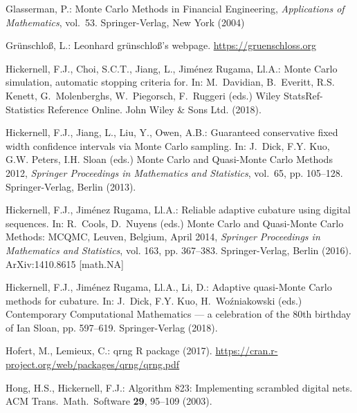 \documentclass[graybox]{svmult}
\begin{document}
\begin{thebibliography}{10}
	Glasserman, P.: {M}onte {C}arlo Methods in Financial Engineering,
	\emph{Applications of Mathematics}, vol.~53.
	\newblock Springer-Verlag, New York (2004)

	Gr\"unschlo{\ss}, L.: Leonhard gr\"unschlo{\ss}'s webpage.
	\newblock \urlprefix\url{https://gruenschloss.org}

	Hickernell, F.J., Choi, S.C.T., Jiang, L., {Jim\'enez Rugama}, {\relax
		Ll}.A.: {M}onte {C}arlo simulation, automatic stopping criteria for.
	\newblock In: M.~Davidian, B.~Everitt, R.S. Kenett, G.~Molenberghs,
	W.~Piegorsch, F.~Ruggeri (eds.) Wiley StatsRef-Statistics Reference Online.
	John Wiley \& Sons Ltd. (2018).
	\newblock {}

	Hickernell, F.J., Jiang, L., Liu, Y., Owen, A.B.: Guaranteed conservative
	fixed width confidence intervals via {M}onte {C}arlo sampling.
	\newblock In: J.~Dick, F.Y. Kuo, G.W. Peters, I.H. Sloan (eds.) {M}onte {C}arlo
	and Quasi-{M}onte {C}arlo Methods 2012, \emph{Springer Proceedings in
		Mathematics and Statistics}, vol.~65, pp. 105--128. Springer-Verlag, Berlin
	(2013).
	\newblock {}

	Hickernell, F.J., {Jim\'enez Rugama}, {\relax Ll}.A.: Reliable adaptive
	cubature using digital sequences.
	\newblock In: R.~Cools, D.~Nuyens (eds.) {M}onte {C}arlo and Quasi-{M}onte
	{C}arlo Methods: {MCQMC}, {L}euven, {B}elgium, {A}pril 2014, \emph{Springer
		Proceedings in Mathematics and Statistics}, vol. 163, pp. 367--383.
	Springer-Verlag, Berlin (2016).
	\newblock ArXiv:1410.8615 [math.NA]

	Hickernell, F.J., {Jim\'enez Rugama}, {\relax Ll}.A., Li, D.: Adaptive
	quasi-{M}onte {C}arlo methods for cubature.
	\newblock In: J.~Dick, F.Y. Kuo, H.~Wo\'zniakowski (eds.) Contemporary
	Computational Mathematics --- a celebration of the 80th birthday of {I}an
	{S}loan, pp. 597--619. Springer-Verlag (2018).
	\newblock {}

	Hofert, M., Lemieux, C.: qrng {R} package (2017).
	\newblock \urlprefix\url{https://cran.r-project.org/web/packages/qrng/qrng.pdf}

	Hong, H.S., Hickernell, F.J.: Algorithm 823: Implementing scrambled digital
	nets.
	\newblock ACM Trans.\ Math.\ Software \textbf{29}, 95--109 (2003).
	\newblock {}


\end{thebibliography}
\end{document}
